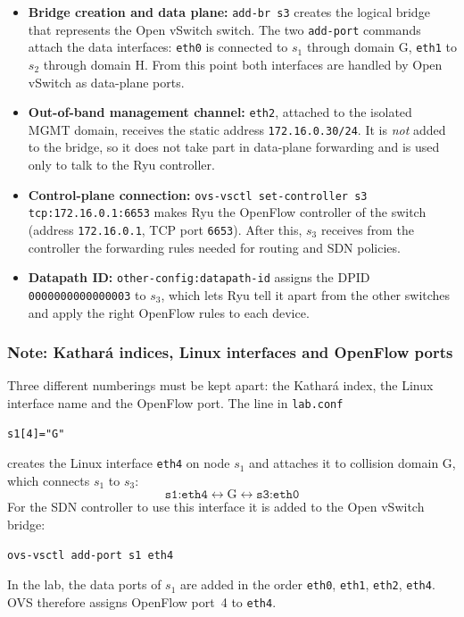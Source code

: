 \documentclass[11pt,a4paper]{article}
\newcommand{\code}[1]{\texttt{#1}}
\begin{document}
\begin{itemize}
  \item \textbf{Bridge creation and data plane:} \code{add-br s3} creates the
        logical bridge that represents the Open vSwitch switch. The two
        \code{add-port} commands attach the data interfaces: \code{eth0} is
        connected to $s_1$ through domain G, \code{eth1} to $s_2$ through
        domain H. From this point both interfaces are handled by Open vSwitch as
        data-plane ports.
  \item \textbf{Out-of-band management channel:} \code{eth2}, attached to the
        isolated MGMT domain, receives the static address
        \code{172.16.0.30/24}. It is \emph{not} added to the bridge, so it does
        not take part in data-plane forwarding and is used only to talk to the
        Ryu controller.
  \item \textbf{Control-plane connection:} \code{ovs-vsctl set-controller s3
        tcp:172.16.0.1:6653} makes Ryu the OpenFlow controller of the switch
        (address \code{172.16.0.1}, TCP port \code{6653}). After this, $s_3$
        receives from the controller the forwarding rules needed for routing and
        SDN policies.
  \item \textbf{Datapath ID:} \code{other-config:datapath-id} assigns the DPID
        \code{0000000000000003} to $s_3$, which lets Ryu tell it apart from the
        other switches and apply the right OpenFlow rules to each device.
\end{itemize}

\subsubsection{Note: Kathar\'a indices, Linux interfaces and OpenFlow ports}
Three different numberings must be kept apart: the Kathar\'a index, the Linux
interface name and the OpenFlow port. The line in \code{lab.conf}
\begin{lstlisting}[style=sh]
s1[4]="G"
\end{lstlisting}
creates the Linux interface \code{eth4} on node $s_1$ and attaches it to
collision domain G, which connects $s_1$ to $s_3$:
\[
  \code{s1:eth4} \leftrightarrow \text{G} \leftrightarrow \code{s3:eth0}
\]
For the SDN controller to use this interface it is added to the Open vSwitch
bridge:
\begin{lstlisting}[style=sh]
ovs-vsctl add-port s1 eth4
\end{lstlisting}
In the lab, the data ports of $s_1$ are added in the order \code{eth0},
\code{eth1}, \code{eth2}, \code{eth4}. OVS therefore assigns OpenFlow port~4 to
\code{eth4}.
\end{document}
